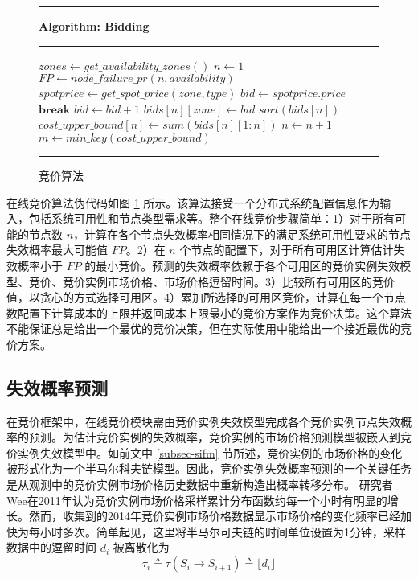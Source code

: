 \begin{figure}
\rule[-.2pt]{\textwidth}{0.9pt}
\textbf{Algorithm: Bidding}

\rule[-.2pt]{\textwidth}{0.5pt}

\begin{algorithmic}[1]

\State $zones\gets get\_availability\_zones()$
\State $n\gets 1$
    \State $FP\gets node\_failure\_pr(n, availability)$
        \State $spotprice\gets get\_spot\_price(zone, type)$
        \State $bid\gets spotprice.price$
                \State $\textbf{break}$
            \Else{}
                \State $bid\gets bid + 1$
            \EndIf
        \EndWhile
        \State $bids[n][zone]\gets bid$
    \EndFor
    \State $sort(bids[n])$
    \State $cost\_upper\_bound[n]\gets sum(bids[n][1:n])$
    \State $n\gets n + 1$
\EndWhile
\State $m\gets min\_key(cost\_upper\_bound)$
\State {}
\end{algorithmic}
\rule[-.2pt]{\textwidth}{0.8pt}
\caption{竞价算法}\label{figure:bidding-algo}
\end{figure}

在线竞价算法伪代码如图 \ref{figure:bidding-algo} 所示。该算法接受一个分布式系统配置信息作为输入，包括系统可用性和节点类型需求等。整个在线竞价步骤简单：1）对于所有可能的节点数 $n$，计算在各个节点失效概率相同情况下的满足系统可用性要求的节点失效概率最大可能值 $FP$。2）在 $n$ 个节点的配置下，对于所有可用区计算估计失效概率小于 $FP$ 的最小竞价。预测的失效概率依赖于各个可用区的竞价实例失效模型、竞价、竞价实例市场价格、市场价格逗留时间。3）比较所有可用区的竞价值，以贪心的方式选择可用区。4）累加所选择的可用区竞价，计算在每一个节点数配置下计算成本的上限并返回成本上限最小的竞价方案作为竞价决策。这个算法不能保证总是给出一个最优的竞价决策，但在实际使用中能给出一个接近最优的竞价方案。

\subsection{失效概率预测}
在竞价框架中，在线竞价模块需由竞价实例失效模型完成各个竞价实例节点失效概率的预测。为估计竞价实例的失效概率，竞价实例的市场价格预测模型被嵌入到竞价实例失效模型中。如前文中 \ref{subsec-sifm} 节所述，竞价实例的市场价格的变化被形式化为一个半马尔科夫链模型。因此，竞价实例失效概率预测的一个关键任务是从观测中的竞价实例市场价格历史数据中重新构造出概率转移分布。
研究者Wee\cite{5948651}在2011年认为竞价实例市场价格采样累计分布函数约每一个小时有明显的增长。然而，收集到的2014年竞价实例市场价格数据显示市场价格的变化频率已经加快为每小时多次。简单起见，这里将半马尔可夫链的时间单位设置为1分钟，采样数据中的逗留时间 $d_i$ 被离散化为
\begin{equation}
\tau_i \triangleq \tau(S_i \rightarrow S_{i+1}) \triangleq \lfloor d_i \rfloor
\end{equation}

